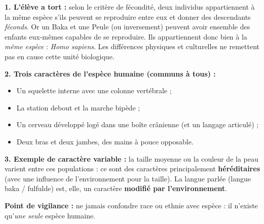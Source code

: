 \documentclass[11pt]{article}
\newcommand{\cle}[1]{{\popxbold\color{popdark}#1}}
\newcounter{popsec}
\newcounter{popsub}
\newcommand{\courssub}[1]{%
  \stepcounter{popsub}%
  \par\vspace{9pt}\noindent{\popxbold\fontsize{11.5}{13}\selectfont\color{popink}{\color{poporange}\thepopsec.\thepopsub}\hspace{6pt}#1}\par\nopagebreak\vspace{4pt}
}
\begin{document}
\begin{corrige}
\textbf{1. L'élève a tort :} selon le \cle{critère de fécondité}, deux individus appartiennent à la même espèce s'ils peuvent se reproduire entre eux et donner des descendants \emph{féconds}. Or un Baka et une Peule (ou inversement) peuvent avoir ensemble des enfants eux-mêmes capables de se reproduire. Ils appartiennent donc bien à la \emph{même espèce} : \emph{Homo sapiens}. Les différences physiques et culturelles ne remettent pas en cause cette unité biologique.

\textbf{2. Trois caractères de l'espèce humaine (communs à tous) :}
\begin{itemize}
    \item Un squelette interne avec une colonne vertébrale ;
    \item La station debout et la marche bipède ;
    \item Un cerveau développé logé dans une boîte crânienne (et un langage articulé) ;
    \item Deux bras et deux jambes, des mains à pouce opposable.
\end{itemize}

\textbf{3. Exemple de caractère variable :} la taille moyenne ou la couleur de la peau varient entre ces populations : ce sont des caractères principalement \textbf{héréditaires} (avec une influence de l'environnement pour la taille). La langue parlée (langue baka / fulfulde) est, elle, un caractère \textbf{modifié par l'environnement}.

\textbf{Point de vigilance :} ne jamais confondre \og race \fg{} ou ethnie avec \og espèce \fg : il n'existe qu'\emph{une seule} espèce humaine.
\end{corrige}

\courssub{Je me prépare au BEPC}
\end{document}

